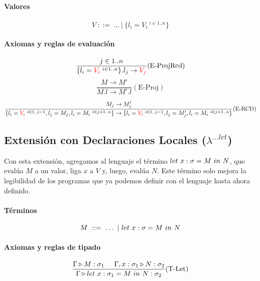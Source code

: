 \paragraph{Valores}
$$V~::=~\dots~|~\{l_i = V_i ~^{i\in 1..n}\}$$

\paragraph{Axiomas y reglas de evaluación}

\begin{equation*}
\frac{j\in 1..n}{\{l_i = \color{red}V_i\color{black} ~^{i\in 1..n}\}.l_j \to \color{red}V_j\color{black}}(\text{E-ProjRcd})
\end{equation*}
\vspace*{5mm}
\begin{equation*}
\frac{M \to M'}{M.l \to M'.l}(\text{E-Proj})
\end{equation*}

\vspace*{5mm}
\begin{equation*}
\frac{M_j\to M_j'}{\{l_i = \color{red}V_i\color{black}~^{i\in 1..j-1}, l_j = M_j, l_i = M_i ~^{i\in j+1..n}\} \to \{l_i = \color{red}V_i\color{black}~^{i\in 1..j-1}, l_j = M'_j, l_i = M_i ~^{i\in j+1..n}\}}(\text{E-RCD})
\end{equation*}
\vspace*{5mm}
\subsection{Extensión con Declaraciones Locales (\texorpdfstring{$\lambda^{...let}$}{lambda ...let})}\label{extension_lambda:let}

Con esta extensión, agregamos al lenguaje el término $let~x:\sigma = M~in~N$, que evalúa $M$ a un valor, liga $x$ a $V$ y, luego, evalúa $N$. Este término solo mejora la legibilidad de los programas que ya podemos definir con el lenguaje hasta ahora definido.

\paragraph{Términos}
$$ M~::=~ \dots~|~let~x:\sigma = M~in~N $$


\paragraph{Axiomas y reglas de tipado}
\begin{equation*}
\frac{\Gamma\triangleright M : \sigma_1\hspace*{5mm}\Gamma,x:\sigma_1\triangleright N : \sigma_2}{\Gamma\triangleright let~x:\sigma_1 = M~in~N : \sigma_2}(\text{T-Let})
\end{equation*}

